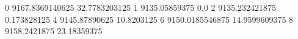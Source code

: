 0 9167.8369140625 32.7783203125
1 9135.05859375 0.0
2 9135.232421875 0.173828125
4 9145.87890625 10.8203125
6 9150.0185546875 14.9599609375
8 9158.2421875 23.18359375
